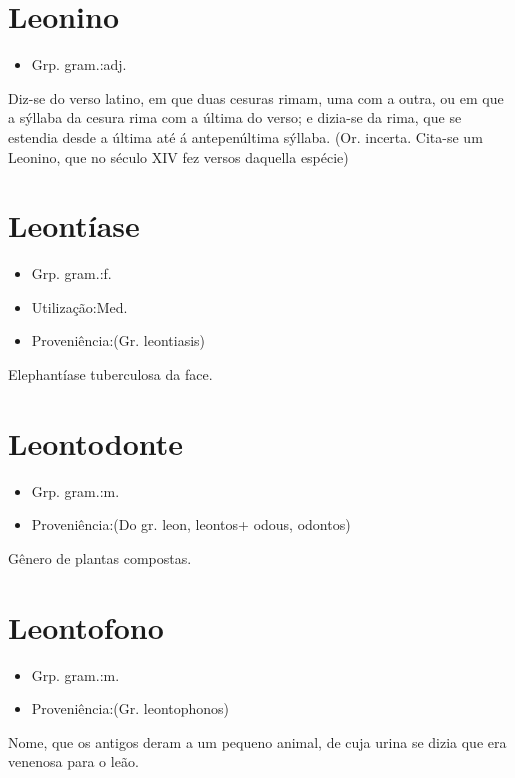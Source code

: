 \section{Leonino}
\begin{itemize}
\item {Grp. gram.:adj.}
\end{itemize}
Diz-se do verso latino, em que duas cesuras rimam, uma com a outra, ou em que a sýllaba da cesura rima com a última do verso; e dizia-se da rima, que se estendia desde a última até á antepenúltima sýllaba.
(Or. incerta. Cita-se um \textunderscore Leonino\textunderscore , que no século XIV fez versos daquella espécie)
\section{Leontíase}
\begin{itemize}
\item {Grp. gram.:f.}
\end{itemize}
\begin{itemize}
\item {Utilização:Med.}
\end{itemize}
\begin{itemize}
\item {Proveniência:(Gr. \textunderscore leontiasis\textunderscore )}
\end{itemize}
Elephantíase tuberculosa da face.
\section{Leontodonte}
\begin{itemize}
\item {Grp. gram.:m.}
\end{itemize}
\begin{itemize}
\item {Proveniência:(Do gr. \textunderscore leon\textunderscore , \textunderscore leontos\textunderscore  + \textunderscore odous\textunderscore , \textunderscore odontos\textunderscore )}
\end{itemize}
Gênero de plantas compostas.
\section{Leontofono}
\begin{itemize}
\item {Grp. gram.:m.}
\end{itemize}
\begin{itemize}
\item {Proveniência:(Gr. \textunderscore leontophonos\textunderscore )}
\end{itemize}
Nome, que os antigos deram a um pequeno animal, de cuja urina se dizia que era venenosa para o leão.

